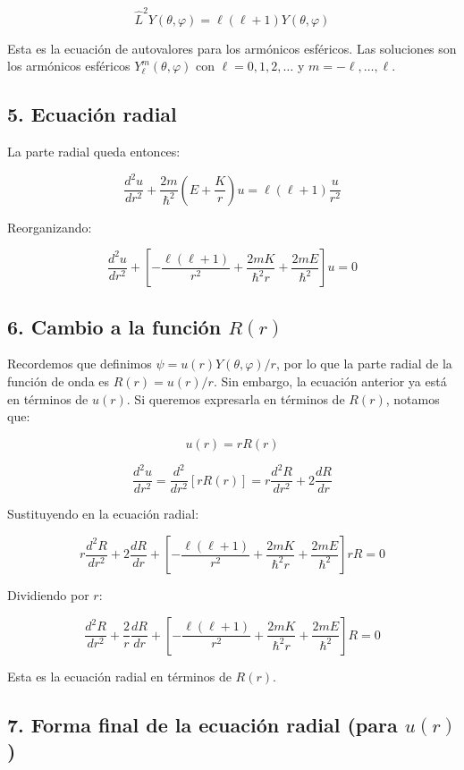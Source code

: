 \documentclass[a4paper]{article}
\begin{document}
\[
\hat{L}^2 Y(\theta, \varphi) = \ell(\ell+1) Y(\theta, \varphi)
\]

Esta es la ecuación de autovalores para los armónicos esféricos. Las soluciones son los armónicos esféricos $Y_\ell^m(\theta, \varphi)$ con $\ell = 0, 1, 2, \ldots$ y $m = -\ell, \ldots, \ell$.

\subsection{5. Ecuación radial}

La parte radial queda entonces:

\[
\frac{d^2u}{dr^2} + \frac{2m}{\hbar^2}\left(E + \frac{K}{r}\right)u = \ell(\ell+1)\frac{u}{r^2}
\]

Reorganizando:

\[
\frac{d^2u}{dr^2} + \left[-\frac{\ell(\ell+1)}{r^2} + \frac{2mK}{\hbar^2 r} + \frac{2mE}{\hbar^2}\right]u = 0
\]

\subsection[6. Cambio a la función R de r]{6. Cambio a la función $R(r)$}

Recordemos que definimos $\psi = u(r)Y(\theta, \varphi)/r$, por lo que la parte radial de la función de onda es $R(r) = u(r)/r$. Sin embargo, la ecuación anterior ya está en términos de $u(r)$. Si queremos expresarla en términos de $R(r)$, notamos que:

\[
u(r) = rR(r)
\]

\[
\frac{d^2u}{dr^2} = \frac{d^2}{dr^2}[rR(r)] = r\frac{d^2R}{dr^2} + 2\frac{dR}{dr}
\]

Sustituyendo en la ecuación radial:

\[
r\frac{d^2R}{dr^2} + 2\frac{dR}{dr} + \left[-\frac{\ell(\ell+1)}{r^2} + \frac{2mK}{\hbar^2 r} + \frac{2mE}{\hbar^2}\right]rR = 0
\]

Dividiendo por $r$:

\[
\frac{d^2R}{dr^2} + \frac{2}{r}\frac{dR}{dr} + \left[-\frac{\ell(\ell+1)}{r^2} + \frac{2mK}{\hbar^2 r} + \frac{2mE}{\hbar^2}\right]R = 0
\]

Esta es la ecuación radial en términos de $R(r)$.

\subsection[7. Forma final de la ecuación radial para u]{7. Forma final de la ecuación radial (para $u(r)$)}
\end{document}
